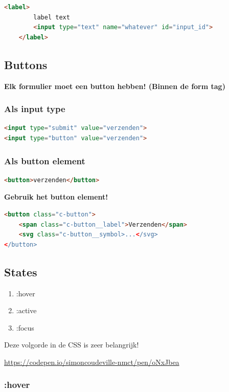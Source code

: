 \documentclass{article}
\newcommand{\bold}[1]{\textbf{#1}}
\begin{document}
\begin{lstlisting}[language=HTML]
    <label>
        label text
        <input type="text" name="whatever" id="input_id">
    </label>
    \end{lstlisting}


\subsection{Buttons}
\bold{Elk formulier moet een button hebben! (Binnen de form tag)}

\subsubsection{Als input type}

\begin{lstlisting}[language=HTML]
<input type="submit" value="verzenden">
<input type="button" value="verzenden">
\end{lstlisting}

\subsubsection{Als button element}

\begin{lstlisting}[language=HTML]
<button>verzenden</button>
\end{lstlisting}

\bold{Gebruik het button element!}

\begin{lstlisting}[language=HTML]
<button class="c-button">
    <span class="c-button__label">Verzenden</span>
    <svg class="c-button__symbol>...</svg>
</button>
\end{lstlisting}

\subsection{States}
\begin{enumerate}
    \item :hover
    \item :active
    \item :focus
\end{enumerate}

Deze volgorde in de CSS is zeer belangrijk!

\url{https://codepen.io/simoncoudeville-nmct/pen/oNxJbea}

\subsubsection{:hover}
\end{document}
